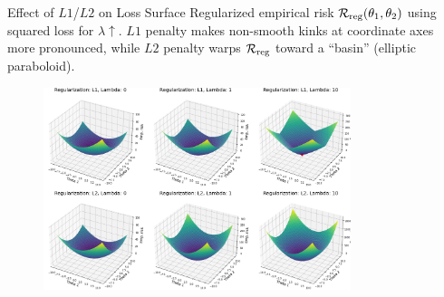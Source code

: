 \documentclass[11pt,compress,t,notes=noshow, xcolor=table]{beamer}
\begin{document}
\begin{vbframe}{Effect of $L1$/$L2$ on Loss Surface}
Regularized empirical risk $\mathcal{R}_{\text{reg}}(\theta_1,\theta_2)$ using squared loss for $\lambda \uparrow$. $L1$ penalty makes non-smooth kinks at coordinate axes more pronounced, while $L2$ penalty warps $\mathcal{R}_{\text{reg}}$ toward a ``basin'' (elliptic paraboloid). 
 
\begin{figure}
\includegraphics[width=0.8\textwidth]{figure/reg_surfaces_l1_l2.png}\\
\end{figure}

\end{vbframe}


\endlecture
\end{document}
